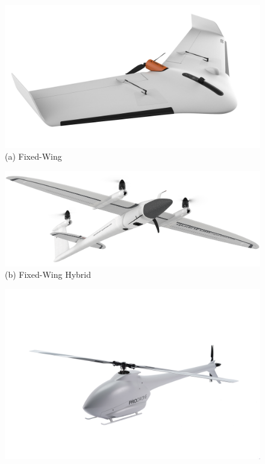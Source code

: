 \begin{figure} [H]
    \centering
    \begin{minipage}{.5\textwidth}
      \centering
      \includegraphics[width=\linewidth]{../Images/Introduction/uav-fixed-wing-example.jpg}
      {(a) Fixed-Wing} 
    \end{minipage}%
    \begin{minipage}{.5\textwidth}
      \centering
      \includegraphics[width=\linewidth]{../Images/Introduction/uav-fixed-wing-hybrid-example.png}
      {(b) Fixed-Wing Hybrid} 
    \end{minipage}
    \begin{minipage}{.5\textwidth}
        \centering
        \includegraphics[width=\linewidth]{../Images/Introduction/uav-single-rotor-example.jpg}

\end{minipage}
\end{figure}
